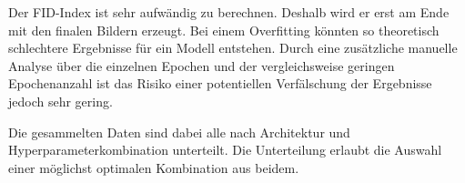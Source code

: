 Der FID-Index ist sehr aufwändig zu berechnen.
Deshalb wird er erst am Ende mit den finalen Bildern erzeugt.
Bei einem Overfitting könnten so theoretisch schlechtere Ergebnisse für ein Modell entstehen.
Durch eine zusätzliche manuelle Analyse über die einzelnen Epochen und der vergleichsweise geringen Epochenanzahl ist das Risiko einer potentiellen Verfälschung der Ergebnisse jedoch sehr gering.
\newline

Die gesammelten Daten sind dabei alle nach Architektur und Hyperparameterkombination unterteilt.
Die Unterteilung erlaubt die Auswahl einer möglichst optimalen Kombination aus beidem.


\begin{comment}

Die Korrektheit bezieht sich dabei auf die generierte Figur im Bild oder auch umliegende Bildpunkte.
Für die Korrektur der richtigen Formen gibt es mehrere Möglichkeiten:
\begin{description}
	\item[Neuronales Kontrollnetz]
	Dafür wird ein weiteres Netzwerk zur Bewertung der Resultate trainiert.
	Diese Variante ist sehr ungenau, da sie wieder von dem Trainingserfolg eines Neuronalen Netzes abhängt.
	Allerdings erlaubt das Neuronale Netzwerk die Analyse von großen Datensätzen, die aber in diesem Fall nicht in der Form nötig sein wird.
	
	\item[händisch]
	Das händische Kontrollieren ist sehr aufwändig.
	Für die Kontrolle sollte das aber möglich sein.
	
	\item[Formvergleich]
	Es ist möglich, die Lösung zu brute-forcen.
	Das bedeutet, es wird jede mögliche Form über das Bild gelegt und diejenige mit der höchsten Überschneidung ausgewählt und als Indikator genommen.
\end{description}



\section{GAN: Bewertungs- und Vergleichskriterien}


\end{comment}
